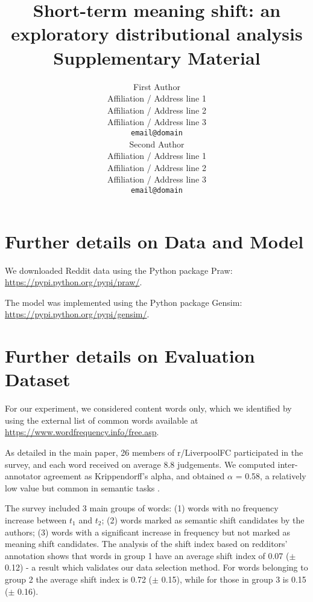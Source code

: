 \documentclass[11pt,a4paper]{article}
\title{Short-term meaning shift: an exploratory distributional analysis\\
\vspace*{0.5cm}
Supplementary Material}
\author{First Author \\
  Affiliation / Address line 1 \\
  Affiliation / Address line 2 \\
  Affiliation / Address line 3 \\
  {\tt email@domain} \\\And
  Second Author \\
  Affiliation / Address line 1 \\
  Affiliation / Address line 2 \\
  Affiliation / Address line 3 \\
  {\tt email@domain} \\}
\date{}
\begin{document}
\maketitle

%
%
%
%



\section{Further details on Data and Model}
We downloaded Reddit data using the Python package Praw: \url{https://pypi.python.org/pypi/praw/}.

The model was implemented using the Python package Gensim: \url{https://pypi.python.org/pypi/gensim/}.

\section{Further details on Evaluation Dataset}

For our experiment, we considered content words only, which we identified by using the external list of common words available at \url{https://www.wordfrequency.info/free.asp}.

As detailed in the main paper, 26 members of r/LiverpoolFC participated in the survey, and each word received on average 8.8 judgements. We computed inter-annotator agreement as Krippendorff's alpha, and obtained $\alpha$ = 0.58, a relatively low value but common in semantic tasks \cite{artstein2008inter}.

The survey included 3 main groups of words:  
(1) words with no frequency increase between $t_1$ and $t_2$; 
(2) words marked as semantic shift candidates by the authors; 
(3) words with a significant increase in frequency but not marked as meaning
shift candidates.
The analysis of the shift index based on redditors' annotation shows that words in group 1 have an average shift index of 0.07 ($\pm$ 0.12) - a result which validates our data selection method. For words belonging to group 2 the average shift index is 0.72 ($\pm$ 0.15), while for those in group 3 is 0.15 ($\pm$ 0.16).
\end{document}
